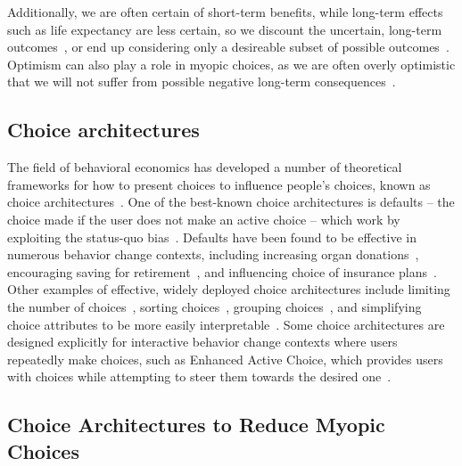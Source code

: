Additionally, we are often certain of short-term benefits, while long-term effects such as life expectancy are less certain, so we discount the uncertain, long-term outcomes~\cite{payne2013life}, or end up considering only a desireable subset of possible outcomes~\cite{shu2008future, koehler1991explanation}. Optimism can also play a role in myopic choices, as we are often overly optimistic that we will not suffer from possible negative long-term consequences~\cite{kahneman1993timid, zauberman2005resource}.

\subsection{Choice architectures}

The field of behavioral economics has developed a number of theoretical frameworks for how to present choices to influence people's choices, known as choice architectures~\cite{thaler1980toward, thaler2009nudge, johnson2012beyond}. One of the best-known choice architectures is defaults -- the choice made if the user does not make an active choice -- which work by exploiting the status-quo bias~\cite{samuelson1988status}. Defaults have been found to be effective in numerous behavior change contexts, including increasing organ donations~\cite{johnson2003defaults}, encouraging saving for retirement~\cite{cronqvist2004design, madrian2001power}, and influencing choice of insurance plans~\cite{johnson1993framing}. Other examples of effective, widely deployed choice architectures include limiting the number of choices~\cite{cronqvist2004design, kling2008misperception}, sorting choices~\cite{lynch2000wine}, grouping choices~\cite{fox2005subjective}, and simplifying choice attributes to be more easily interpretable~\cite{peters2009bringing, soll2013consumer}. Some choice architectures are designed explicitly for interactive behavior change contexts where users repeatedly make choices, such as Enhanced Active Choice, which provides users with choices while attempting to steer them towards the desired one~\cite{keller2011enhanced}.

\subsection{Choice Architectures to Reduce Myopic Choices}

